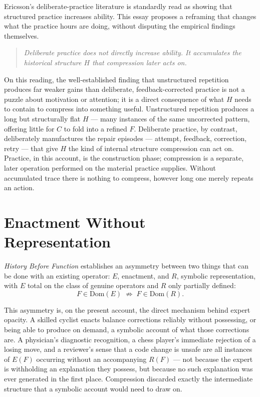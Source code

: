 \documentclass[11pt]{article}
\begin{document}
Ericsson's deliberate-practice literature is standardly read as showing that structured practice increases ability. This essay proposes a reframing that changes what the practice hours are doing, without disputing the empirical findings themselves.

\begin{quote}
\itshape Deliberate practice does not directly increase ability. It accumulates the historical structure $H$ that compression later acts on.
\end{quote}

On this reading, the well-established finding that unstructured repetition produces far weaker gains than deliberate, feedback-corrected practice is not a puzzle about motivation or attention; it is a direct consequence of what $H$ needs to contain to compress into something useful. Unstructured repetition produces a long but structurally flat $H$ — many instances of the same uncorrected pattern, offering little for $C$ to fold into a refined $F$. Deliberate practice, by contrast, deliberately manufactures the repair episodes — attempt, feedback, correction, retry — that give $H$ the kind of internal structure compression can act on. Practice, in this account, is the construction phase; compression is a separate, later operation performed on the material practice supplies. Without accumulated trace there is nothing to compress, however long one merely repeats an action.

\section{Enactment Without Representation}

\emph{History Before Function} establishes an asymmetry between two things that can be done with an existing operator: $E$, enactment, and $R$, symbolic representation, with $E$ total on the class of genuine operators and $R$ only partially defined:
\[
F \in \mathrm{Dom}(E) \;\not\Rightarrow\; F \in \mathrm{Dom}(R).
\]

This asymmetry is, on the present account, the direct mechanism behind expert opacity. A skilled cyclist enacts balance corrections reliably without possessing, or being able to produce on demand, a symbolic account of what those corrections are. A physician's diagnostic recognition, a chess player's immediate rejection of a losing move, and a reviewer's sense that a code change is unsafe are all instances of $E(F)$ occurring without an accompanying $R(F)$ — not because the expert is withholding an explanation they possess, but because no such explanation was ever generated in the first place. Compression discarded exactly the intermediate structure that a symbolic account would need to draw on.
\end{document}
